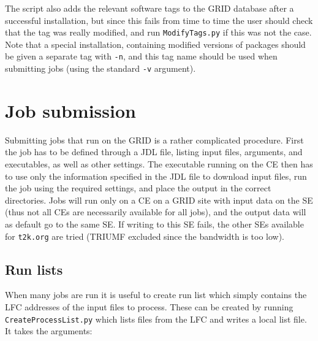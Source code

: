 \documentclass[11pt]{article}
\begin{document}
The script also adds the relevant software tags to the GRID database after a successful installation, but since this fails from time to time the user should check that the tag was really modified, and run \verb+ModifyTags.py+ if this was not the case. Note that a special installation, containing modified versions of packages should be given a separate tag with \verb+-n+, and this tag name should be used when submitting jobs (using the standard \verb+-v+ argument). 

\clearpage
\section{Job submission}
\label{sec:submission}

Submitting jobs that run on the GRID is a rather complicated
procedure. First the job has to be defined through a JDL file, listing
input files, arguments, and executables, as well as other
settings. The executable running on the CE then has to use only the
information specified in the JDL file to download input files, run the
job using the required settings, and place the output in the correct
directories. Jobs will run only on a CE on a GRID site with input data
on the SE (thus not all CEs are necessarily available for all jobs),
and the output data will as default go to the same SE. If writing to
this SE fails, the other SEs available for \verb+t2k.org+ are tried
(TRIUMF excluded since the bandwidth is too low).

\subsection{Run lists}
When many jobs are run it is useful to create run list which simply
contains the LFC addresses of the input files to process. These can be
created by running \verb+CreateProcessList.py+ which lists files from
the LFC and writes a local list file. It takes the arguments:
\end{document}
